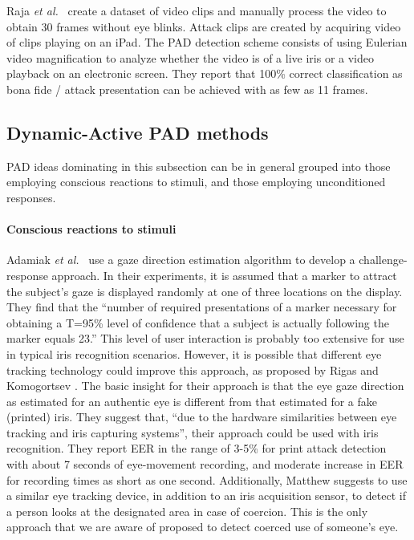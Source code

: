 \documentclass[format=acmsmall, review=false, timestamp=false]{acmart}
\newcommand{\etal}{{\it et al.}~}
\begin{document}
Raja \etal \cite{Raja_TIFS_2015} create a dataset of video clips {and} manually process the video to obtain 30 frames without eye blinks. Attack clips are created by acquiring video of clips playing on an iPad. The PAD detection scheme consists of using Eulerian video magnification to analyze whether the video is of a live iris or a video playback on an electronic screen. They report that 100\% correct classification as bona fide / attack {presentation} can be achieved with as few as 11 frames.





\subsection{Dynamic-Active PAD methods}
\label{sec:PADmethods_DynamicActive}

PAD ideas dominating in this subsection can be in general grouped into those employing conscious reactions to stimuli, and {those employing} unconditioned responses.

\paragraph{Conscious reactions to stimuli}

Adamiak \etal \cite{Adamiak_FedCSIS_2015} use a gaze direction estimation algorithm to develop a challenge-response approach. In their experiments, it is assumed that a marker to attract the subject's gaze is displayed randomly at one of three locations on the display. They find that the ``number of required presentations of a marker necessary for obtaining a T=95\% level of confidence that a subject is actually following the marker equals 23.'' This level of user interaction is probably too extensive for use in typical iris recognition scenarios. However, it is possible that different eye tracking technology could improve this approach, as proposed by Rigas and Komogortsev \cite{Rigas_IJCB_2014,Rigas_PRL_2015}. The basic insight for their approach is that the eye gaze direction as estimated for a{n authentic} eye is different from that estimated for a {fake (printed)} iris. They suggest that, ``due to the hardware similarities between eye tracking and iris capturing systems'', their approach could be used with iris recognition. They report EER in the range of 3-5\% for print attack detection with about 7 seconds of eye-movement recording, and moderate increase in EER for recording times as short as one second. Additionally, Matthew \cite{Matthew_PhD_thesis_2016} suggests to use {a} similar eye tracking device, in addition to an iris acquisition sensor, to detect if a person looks at the designated area in case of coercion. This is the only approach {that we are aware of} proposed to detect coerced use of someone's eye. 
\end{document}
